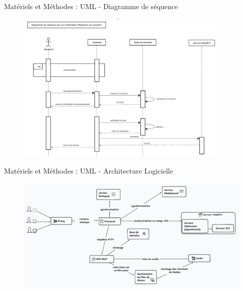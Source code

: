 \documentclass{beamer}
\begin{document}
\begin{frame}{Matériels et Méthodes : \small{UML} - \footnotesize{Diagramme de séquence}}
  \begin{figure}[H]
    \centering
    \includegraphics[width=0.9\textwidth]{../../images/join-meet-sequence-diag.png}
\end{figure}
\end{frame}

\begin{frame}{Matériels et Méthodes : \small{UML} - \footnotesize{Architecture Logicielle}}
  \begin{figure}[H]
    \centering
    \includegraphics[width=\textwidth]{../../images/studx-system-design}
\end{figure}
\end{frame}
\end{document}
